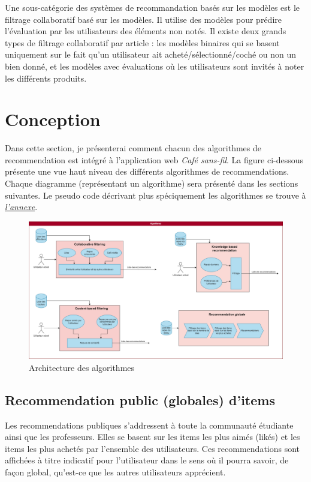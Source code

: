 \documentclass[11pt]{article}
\begin{document}
Une sous-catégorie des systèmes de recommandation basés sur les modèles est le filtrage collaboratif basé sur les modèles. Il utilise des modèles pour prédire l’évaluation par les utilisateurs des éléments non notés. Il existe deux grands types de filtrage collaboratif par article : les modèles binaires qui se basent uniquement sur le fait qu’un utilisateur ait acheté/sélectionné/coché ou non un bien donné, et les modèles avec évaluations où les utilisateurs sont invités à noter les différents produits.



\newpage
\section{Conception}
Dans cette section, je présenterai comment chacun des algorithmes de recommendation est intégré à l'application web \textit{Café sans-fil}. La figure ci-dessous présente une vue haut niveau des différents algorithmes de recommendations. Chaque diagramme (représentant un algorithme) sera présenté dans les sections suivantes. Le pseudo code décrivant plus spéciquement les algorithmes se trouve à \hyperref[annexe]{\textit{l'annexe}}.
\begin{figure}[h]
%
\includegraphics[scale=0.3]{images/Pipeline.drawio.png} 
\caption{Architecture des algorithmes}
\end{figure}

\subsection{Recommendation public (globales) d'items}
Les recommendations publiques s'addressent à toute la communauté étudiante ainsi que les professeurs. Elles se basent sur les items les plus aimés (likés) et les items les plus achetés par l'ensemble des utilisateurs. Ces recommendations sont affichées à titre indicatif pour l'utilisateur dans le sens où il pourra savoir, de façon global, qu'est-ce que les autres utilisateurs apprécient.\\
\end{document}
